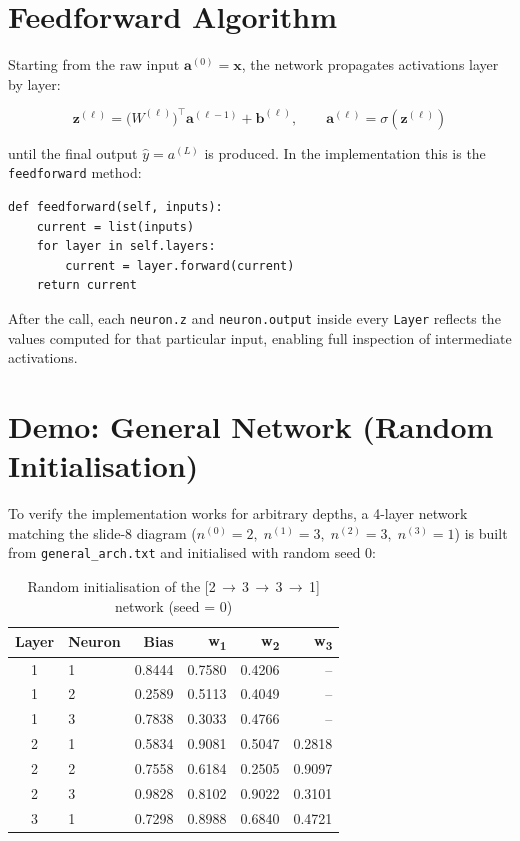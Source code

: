 \documentclass[12pt,a4paper]{article}
\begin{document}
\section{Feedforward Algorithm}

Starting from the raw input $\mathbf{a}^{(0)} = \mathbf{x}$, the network
propagates activations layer by layer:

\[
    \mathbf{z}^{(\ell)} = \bigl(W^{(\ell)}\bigr)^{\!\top} \mathbf{a}^{(\ell-1)}
                          + \mathbf{b}^{(\ell)}, \qquad
    \mathbf{a}^{(\ell)} = \sigma\!\left(\mathbf{z}^{(\ell)}\right)
\]

until the final output $\hat{y} = a^{(L)}$ is produced.
In the implementation this is the \texttt{feedforward} method:

\begin{lstlisting}[caption={Feedforward pass}]
def feedforward(self, inputs):
    current = list(inputs)
    for layer in self.layers:
        current = layer.forward(current)
    return current
\end{lstlisting}

After the call, each \texttt{neuron.z} and \texttt{neuron.output} inside
every \texttt{Layer} reflects the values computed for that particular input,
enabling full inspection of intermediate activations.

\section{Demo: General Network (Random Initialisation)}

To verify the implementation works for arbitrary depths, a 4-layer network
matching the slide-8 diagram ($n^{(0)}=2,\; n^{(1)}=3,\; n^{(2)}=3,\; n^{(3)}=1$)
is built from \texttt{general\_arch.txt} and initialised with random seed 0:

\begin{table}[H]
\centering
\caption{Random initialisation of the [2\,$\to$\,3\,$\to$\,3\,$\to$\,1] network (seed = 0)}
\begin{tabular}{clrrrr}
\toprule
\textbf{Layer} & \textbf{Neuron} & \textbf{Bias} & \textbf{w\textsubscript{1}} & \textbf{w\textsubscript{2}} & \textbf{w\textsubscript{3}} \\
\midrule
1 & 1 & 0.8444 & 0.7580 & 0.4206 & -- \\
1 & 2 & 0.2589 & 0.5113 & 0.4049 & -- \\
1 & 3 & 0.7838 & 0.3033 & 0.4766 & -- \\
\midrule
2 & 1 & 0.5834 & 0.9081 & 0.5047 & 0.2818 \\
2 & 2 & 0.7558 & 0.6184 & 0.2505 & 0.9097 \\
2 & 3 & 0.9828 & 0.8102 & 0.9022 & 0.3101 \\
\midrule
3 & 1 & 0.7298 & 0.8988 & 0.6840 & 0.4721 \\
\bottomrule
\end{tabular}
\end{table}
\end{document}

